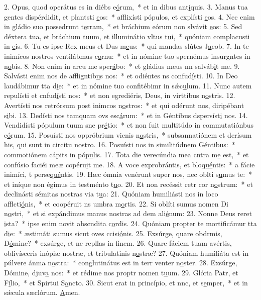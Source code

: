 2. Opus, quod operátus es in diébs e\uline{ó}rum,~* et in dibus ant\uline{í}quis.
3. Manus tua gentes dispérdidit, et plantsti \uline{e}os:~* afflixísti pópulos, et explísti \uline{e}os.
4. Nec enim in gládio suo possedrunt t\uline{e}rram,~* et bráchium eórum non slvávit \uline{e}os:
5. Sed déxtera tua, et bráchium tuum, et illuminátio vltus t\uline{u}i,~* quóniam complacusti in \uline{e}is.
6. Tu es ipse Rex meus et Dus m\uline{e}us:~* qui mandas slútes J\uline{a}cob.
7. In te inimícos nostros ventilábmus c\uline{o}rnu:~* et in nómine tuo spernémus insurgntes in n\uline{o}bis.
8. Non enim in arcu me sper\uline{á}bo:~* et gládius meus nn salváb\uline{i}t me.
9. Salvásti enim nos de affligntib\uline{u}s nos:~* et odiéntes ns confud\uline{í}sti.
10. In Deo laudábimur tta d\uline{i}e:~* et in nómine tuo confitébimr in sǽc\uline{u}lum.
11. Nunc autem repulísti et cnfud\uline{í}sti nos:~* et non egrediéris, Deus, in virttibus n\uline{o}stris.
12. Avertísti nos retrórsum post inimcos n\uline{o}stros:~* et qui odérunt nos, diripébant s\uline{i}bi.
13. Dedísti nos tamquam ovs esc\uline{á}rum:~* et in Géntibus dspersíst\uline{i} nos.
14. Vendidísti pópulum tuum sne pr\uline{é}tio:~* et non fuit multitúdo in commutatiónbus e\uline{ó}rum.
15. Posuísti nos oppróbrium vicnis n\uline{o}stris,~* subsannatiónem et derísum his, qui sunt in circitu n\uline{o}stro.
16. Posuísti nos in similitúdnem G\uline{é}ntibus:~* commotiónem cápits in póp\uline{u}lis.
17. Tota die verecúndia mea cntra m\uline{e} est,~* et confúsio faciéi meæ copéru\uline{i}t me.
18. A voce exprobrántis, et blo\uline{qué}ntis:~* a fácie inimíci, t perse\uline{qué}ntis.
19. Hæc ómnia venérunt super nos, nec oblti s\uline{u}mus te:~* et iníque non égimus in testménto t\uline{u}o.
20. Et non recéssit retr cor n\uline{o}strum:~* et declinásti sémitas nostras  via t\uline{u}a:
21. Quóniam humiliásti nos in loco afflcti\uline{ó}nis,~* et coopéruit ns umbra m\uline{o}rtis.
22. Si oblíti sumus nomen Di n\uline{o}stri,~* et si expándimus manus nostras ad dem ali\uline{é}num:
23. Nonne Deus reret \uline{i}sta?~* ipse enim novit abscndita c\uline{o}rdis.
24. Quóniam propter te mortificámur tta d\uline{i}e:~* æstimáti sumus sicut oves ccisi\uline{ó}nis.
25. Exsúrge, quare obdrmis, D\uline{ó}mine?~* exsúrge, et ne repllas in f\uline{i}nem.
26. Quare fáciem tuam avértis, oblivísceris inópiæ nostræ, et tribulatinis n\uline{o}stræ?
27. Quóniam humiliáta est in púlvere ánma n\uline{o}stra:~* conglutinátus est in terr venter n\uline{o}ster.
28. Exsúrge, Dómine, djuv\uline{a} nos:~* et rédime nos proptr nomen t\uline{u}um.
29. Glória Patr, et F\uline{í}lio,~* et Spirtui S\uline{a}ncto.
30. Sicut erat in princípio, et nnc, et s\uline{e}mper,~* et in sǽcula sæclórum. \uline{A}men.
